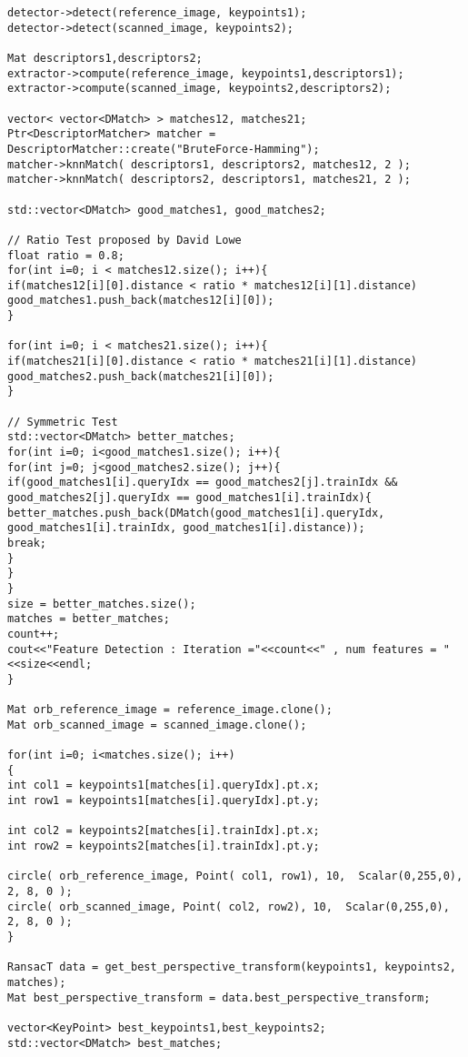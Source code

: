 \begin{lstlisting}
detector->detect(reference_image, keypoints1);
detector->detect(scanned_image, keypoints2);

Mat descriptors1,descriptors2;
extractor->compute(reference_image, keypoints1,descriptors1);
extractor->compute(scanned_image, keypoints2,descriptors2);

vector< vector<DMatch> > matches12, matches21;
Ptr<DescriptorMatcher> matcher = DescriptorMatcher::create("BruteForce-Hamming");
matcher->knnMatch( descriptors1, descriptors2, matches12, 2 );
matcher->knnMatch( descriptors2, descriptors1, matches21, 2 );

std::vector<DMatch> good_matches1, good_matches2;

// Ratio Test proposed by David Lowe 
float ratio = 0.8;
for(int i=0; i < matches12.size(); i++){
if(matches12[i][0].distance < ratio * matches12[i][1].distance)
good_matches1.push_back(matches12[i][0]);
}

for(int i=0; i < matches21.size(); i++){
if(matches21[i][0].distance < ratio * matches21[i][1].distance)
good_matches2.push_back(matches21[i][0]);
}

// Symmetric Test
std::vector<DMatch> better_matches;
for(int i=0; i<good_matches1.size(); i++){
for(int j=0; j<good_matches2.size(); j++){
if(good_matches1[i].queryIdx == good_matches2[j].trainIdx && good_matches2[j].queryIdx == good_matches1[i].trainIdx){
better_matches.push_back(DMatch(good_matches1[i].queryIdx, good_matches1[i].trainIdx, good_matches1[i].distance));
break;
}
}
}
size = better_matches.size();
matches = better_matches;
count++;
cout<<"Feature Detection : Iteration ="<<count<<" , num features = "<<size<<endl;
}

Mat orb_reference_image = reference_image.clone();
Mat orb_scanned_image = scanned_image.clone();

for(int i=0; i<matches.size(); i++)
{
int col1 = keypoints1[matches[i].queryIdx].pt.x;
int row1 = keypoints1[matches[i].queryIdx].pt.y;

int col2 = keypoints2[matches[i].trainIdx].pt.x;
int row2 = keypoints2[matches[i].trainIdx].pt.y;

circle( orb_reference_image, Point( col1, row1), 10,  Scalar(0,255,0), 2, 8, 0 );
circle( orb_scanned_image, Point( col2, row2), 10,  Scalar(0,255,0), 2, 8, 0 );
}

RansacT data = get_best_perspective_transform(keypoints1, keypoints2, matches);
Mat best_perspective_transform = data.best_perspective_transform;

vector<KeyPoint> best_keypoints1,best_keypoints2;
std::vector<DMatch> best_matches;


\end{lstlisting}
